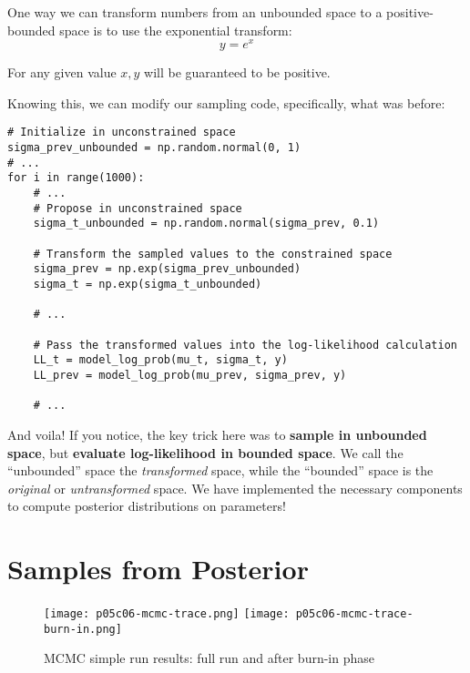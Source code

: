 One way we can transform numbers from an unbounded space to a positive-bounded space is to use the exponential transform:
\begin{equation}
y=e^x
\end{equation}

For any given value $x,y$ will be guaranteed to be positive.

Knowing this, we can modify our sampling code, specifically, what was before:

\begin{lstlisting}
# Initialize in unconstrained space
sigma_prev_unbounded = np.random.normal(0, 1)
# ...
for i in range(1000):
    # ...
    # Propose in unconstrained space
    sigma_t_unbounded = np.random.normal(sigma_prev, 0.1)

    # Transform the sampled values to the constrained space
    sigma_prev = np.exp(sigma_prev_unbounded)
    sigma_t = np.exp(sigma_t_unbounded)

    # ...

    # Pass the transformed values into the log-likelihood calculation
    LL_t = model_log_prob(mu_t, sigma_t, y)
    LL_prev = model_log_prob(mu_prev, sigma_prev, y)

    # ...
\end{lstlisting}

And voila! If you notice, the key trick here was to \textbf{sample in unbounded space}, but \textbf{evaluate log-likelihood in bounded space}. We call the ``unbounded'' space the \emph{transformed} space, while the ``bounded'' space is the \emph{original} or \emph{untransformed} space. We have implemented the necessary components to compute posterior distributions on parameters!

\section{Samples from Posterior}

\begin{figure*}[th]
\texttt{[image: p05c06-mcmc-trace.png]}
\texttt{[image: p05c06-mcmc-trace-burn-in.png]}
\caption{MCMC simple run results: full run and after burn-in phase}
\label{fig:p05c06-mcmc-trace}
\end{figure*}


